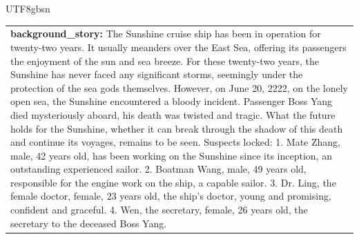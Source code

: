 \documentclass[11pt]{article}
\begin{document}
{\begin{CJK}{UTF8}{gbsn}
\begin{table}[ht!]
\begin{minipage}[t]{\linewidth}
\begin{tabular}{|m{16cm}|}
\textbf{   background\_story:} \small The Sunshine cruise ship has been in operation for twenty-two years. It usually meanders over the East Sea, offering its passengers the enjoyment of the sun and sea breeze. For these twenty-two years, the Sunshine has never faced any significant storms, seemingly under the protection of the sea gods themselves. However, on June 20, 2222, on the lonely open sea, the Sunshine encountered a bloody incident. Passenger Boss Yang died mysteriously aboard, his death was twisted and tragic. What the future holds for the Sunshine, whether it can break through the shadow of this death and continue its voyages, remains to be seen. Suspects locked: 1. Mate Zhang, male, 42 years old, has been working on the Sunshine since its inception, an outstanding experienced sailor. 2. Boatman Wang, male, 49 years old, responsible for the engine work on the ship, a capable sailor. 3. Dr. Ling, the female doctor, female, 23 years old, the ship's doctor, young and promising, confident and graceful. 4. Wen, the secretary, female, 26 years old, the secretary to the deceased Boss Yang.  \\

\end{tabular}
\end{minipage}
\end{table}
\end{CJK}



}
\end{document}
